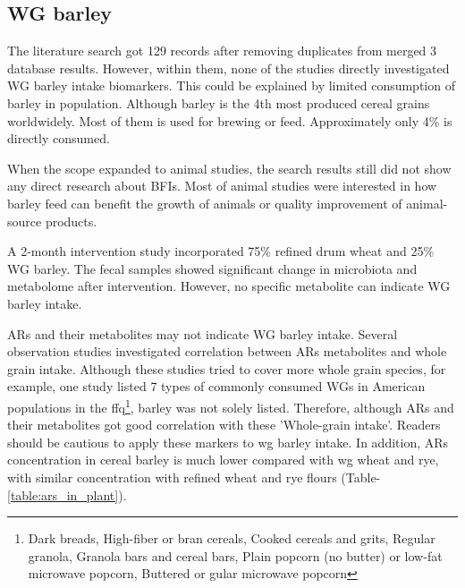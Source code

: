 \subsection{WG barley}
The literature search got 129 records after removing duplicates from merged 3 database results. However, within them, none of the studies directly investigated WG barley intake biomarkers. This could be explained by limited consumption of barley in population. Although barley is the 4th most produced cereal grains worldwidely. Most of them is used for brewing or feed. Approximately only 4\% is directly consumed\cite{Baik2008}.

When the scope expanded to animal studies, the search results still did not show any direct research about BFIs. Most of animal studies were interested in how barley feed can benefit the growth of animals or quality improvement of animal-source products\cite{ISI:000272990200002,Foster2003}.

A 2-month intervention study\cite{DeAngelis2015} incorporated 75\% refined drum wheat and 25\% WG barley. The fecal samples showed significant change in microbiota and metabolome after intervention\cite{DeAngelis2015}. However, no specific metabolite can indicate WG barley intake.

ARs and their metabolites may not indicate WG barley intake. Several observation studies\cite{ISI:000309032000011,ISI:000259554500019} investigated correlation between ARs metabolites and whole grain intake. Although these studies tried to cover more whole grain species, for example, one study\cite{ISI:000259554500019} listed 7 types of commonly consumed WGs in American populations in the \acrfull{ffq}\footnote{Dark breads, High-fiber or bran cereals, Cooked cereals and grits, Regular granola, Granola bars and cereal bars, Plain popcorn (no butter) or low-fat microwave popcorn, Buttered or gular microwave popcorn}, barley was not solely listed. Therefore, although ARs and their metabolites got good correlation with these 'Whole-grain intake'. Readers should be cautious to apply these markers to \acrshort{wg} barley intake. 
In addition, ARs concentration in cereal barley is much lower compared with \acrshort{wg} wheat and rye, with similar concentration with refined wheat and rye flours (Table-\ref{table:ars_in_plant}). 

